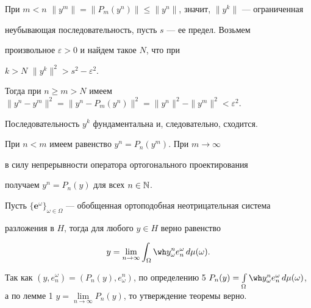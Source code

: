 \begin{pf}


При $m<n$\; $\|y^m\|


=\|P_m(y^n)\|\leqslant\|y^n\|$, значит, $\|y^k\|$ --- ограниченная


неубывающая последовательность, пусть $s$ --- ее предел. Возьмем


произвольное $\varepsilon>0$ и найдем такое $N$, что при


$k>N$\; $\|y^k\|^2>s^2-\varepsilon^2$.


Тогда при $n\geqslant m>N$ имеем $\|y^n


-y^m\|^2=\|y^n-P_m(y^n)\|^2=\|y^n\|^2-\|y^m\|^2<\varepsilon^2$.


Последовательность $y^k$ фундаментальна и, следовательно, сходится.


При $n<m$ имеем равенство $y^n=P_n(y^m)$. При $m\to\infty$


в силу непрерывности оператора ортогонального проектирования


получаем $y^n=P_n(y)$ для всех $n\in\Bbb N$.


\end{pf}





\begin{thm}\hspace{-1.8mm}{\bf.}


Пусть $\{\boldsymbol e^\omega\}_{\omega\in


\Omega}$ --- обобщенная ортоподобная неотрицательная система


разложения в $H$, тогда для любого $y\in H$ верно равенство


\begin{equation}


y=\lim_{n\to\infty}\int_\Omega \wh y^n_\omega


e_n^\omega\,d\mu(\omega).


\end{equation}


\end{thm}





\begin{pf}


Так как $(y,e_n^\omega)=(P_n(y),e^n_\omega


)$, по определению 5\; $P_n(y)=\int\limits_\Omega \wh y^n_\omega


e_n^\omega\,d\mu(\omega)$, а по лемме 1\; $y=\lim\limits_{n\to\infty}


P_n(y)$, то утверждение теоремы верно.


\end{pf}





